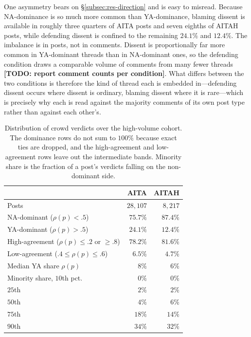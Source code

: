 One asymmetry bears on \S\ref{subsec:res-direction} and is easy to misread.
Because NA-dominance is so much more common than YA-dominance, blaming dissent
is available in roughly three quarters of AITA posts and seven eighths of AITAH
posts, while defending dissent is confined to the remaining $24.1\%$ and
$12.4\%$. The imbalance is in posts, not in comments. Dissent is proportionally
far more common in YA-dominant threads than in NA-dominant ones, so the
defending condition draws a comparable volume of comments from many fewer
threads \textbf{[TODO: report comment counts per condition]}. What differs
between the two conditions is therefore the kind of thread each is embedded
in---defending dissent occurs where dissent is ordinary, blaming dissent where
it is rare---which is precisely why each is read against the majority comments
of its own post type rather than against each other's.

\begin{table}[t]
  \centering
  \begin{tabular}{@{}lrr@{}}
    \toprule
    & AITA & AITAH \\
    \midrule
    Posts & $28{,}107$ & $8{,}217$ \\
    \addlinespace
    NA-dominant ($\rho(p)<.5$) & $75.7\%$ & $87.4\%$ \\
    YA-dominant ($\rho(p)>.5$) & $24.1\%$ & $12.4\%$ \\
    \addlinespace
    High-agreement ($\rho(p)\le.2$ or $\ge.8$) & $78.2\%$ & $81.6\%$ \\
    Low-agreement ($.4\le\rho(p)\le.6$) & $6.5\%$ & $4.7\%$ \\
    \addlinespace
    Median YA share $\rho(p)$ & $8\%$ & $6\%$ \\
    \addlinespace
    Minority share, $10$th pct.\ & $0\%$ & $0\%$ \\
    \quad $25$th & $2\%$ & $2\%$ \\
    \quad $50$th & $4\%$ & $6\%$ \\
    \quad $75$th & $18\%$ & $14\%$ \\
    \quad $90$th & $34\%$ & $32\%$ \\
    \bottomrule
  \end{tabular}
  \caption{Distribution of crowd verdicts over the high-volume cohort. The
  dominance rows do not sum to $100\%$ because exact ties are dropped, and the
  high-agreement and low-agreement rows leave out the intermediate bands. Minority
  share is the fraction of a post's verdicts falling on the non-dominant side.}
  \label{tab:verdict-distribution}
\end{table}

